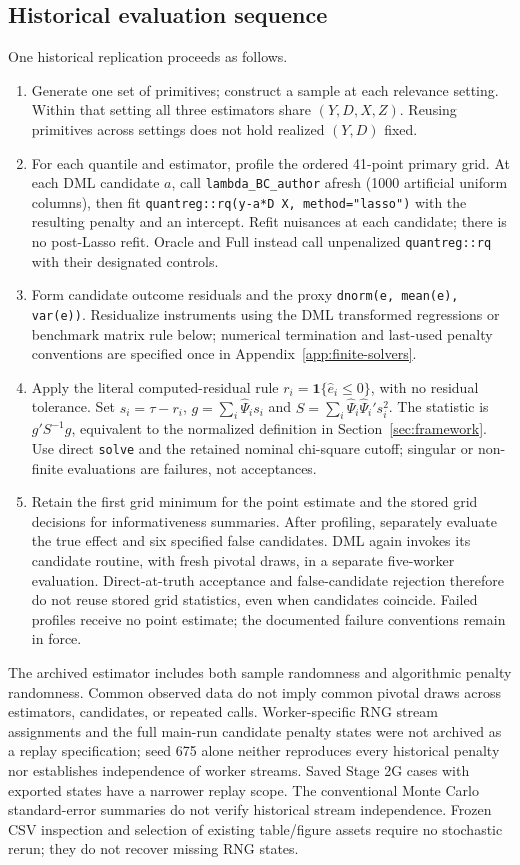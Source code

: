 \subsection{Historical evaluation sequence}
\label{app:evaluation-sequence}
One historical replication proceeds as follows.
\begin{enumerate}
\item Generate one set of primitives; construct a sample at each relevance setting. Within that setting all three estimators share $(Y,D,X,Z)$. Reusing primitives across settings does not hold realized $(Y,D)$ fixed.
\item For each quantile and estimator, profile the ordered 41-point primary grid. At each DML candidate $a$, call \texttt{lambda\_BC\_author} afresh (1000 artificial uniform columns), then fit \texttt{quantreg::rq(y-a*D\string~X, method="lasso")} with the resulting penalty and an intercept. Refit nuisances at each candidate; there is no post-Lasso refit. Oracle and Full instead call unpenalized \texttt{quantreg::rq} with their designated controls.
\item Form candidate outcome residuals and the proxy \texttt{dnorm(e, mean(e), var(e))}. Residualize instruments using the DML transformed regressions or benchmark matrix rule below; numerical termination and last-used penalty conventions are specified once in Appendix~\ref{app:finite-solvers}.
\item Apply the literal computed-residual rule $r_i=\mathbf1\{\widehat e_i\leq0\}$, with no residual tolerance. Set $s_i=\tau-r_i$, $g=\sum_i\widehat\Psi_i s_i$ and $S=\sum_i\widehat\Psi_i\widehat\Psi_i' s_i^2$. The statistic is $g'S^{-1}g$, equivalent to the normalized definition in Section~\ref{sec:framework}. Use direct \texttt{solve} and the retained nominal chi-square cutoff; singular or non-finite evaluations are failures, not acceptances.
\item Retain the first grid minimum for the point estimate and the stored grid decisions for informativeness summaries. After profiling, separately evaluate the true effect and six specified false candidates. DML again invokes its candidate routine, with fresh pivotal draws, in a separate five-worker evaluation. Direct-at-truth acceptance and false-candidate rejection therefore do not reuse stored grid statistics, even when candidates coincide. Failed profiles receive no point estimate; the documented failure conventions remain in force.
\end{enumerate}
The archived estimator includes both sample randomness and algorithmic penalty randomness. Common observed data do not imply common pivotal draws across estimators, candidates, or repeated calls. Worker-specific RNG stream assignments and the full main-run candidate penalty states were not archived as a replay specification; seed 675 alone neither reproduces every historical penalty nor establishes independence of worker streams. Saved Stage 2G cases with exported states have a narrower replay scope. The conventional Monte Carlo standard-error summaries do not verify historical stream independence. Frozen CSV inspection and selection of existing table/figure assets require no stochastic rerun; they do not recover missing RNG states.

